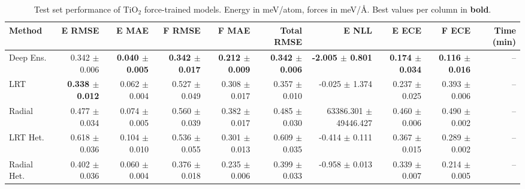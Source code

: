 \begin{table}
\centering
\caption{Test set performance of TiO$_2$ force-trained models. Energy in meV/atom, forces in meV/\AA{}. Best values per column in \textbf{bold}.}
\label{tab:tio2_results}
\begin{tabular}{lrrrrrrrrr}
\toprule
Method & E RMSE & E MAE & F RMSE & F MAE & Total RMSE & E NLL & E ECE & F ECE & Time (min) \\
\midrule
Deep Ens. & 0.342 $\pm$ 0.006 & \textbf{0.040 $\pm$ 0.005} & \textbf{0.342 $\pm$ 0.017} & \textbf{0.212 $\pm$ 0.009} & \textbf{0.342 $\pm$ 0.006} & \textbf{-2.005 $\pm$ 0.801} & \textbf{0.174 $\pm$ 0.034} & \textbf{0.116 $\pm$ 0.016} & -- \\
LRT & \textbf{0.338 $\pm$ 0.012} & 0.062 $\pm$ 0.004 & 0.527 $\pm$ 0.049 & 0.308 $\pm$ 0.017 & 0.357 $\pm$ 0.010 & -0.025 $\pm$ 1.374 & 0.237 $\pm$ 0.025 & 0.393 $\pm$ 0.006 & -- \\
Radial & 0.477 $\pm$ 0.034 & 0.074 $\pm$ 0.005 & 0.560 $\pm$ 0.039 & 0.382 $\pm$ 0.017 & 0.485 $\pm$ 0.030 & 63386.301 $\pm$ 49446.427 & 0.460 $\pm$ 0.006 & 0.490 $\pm$ 0.002 & -- \\
LRT Het. & 0.618 $\pm$ 0.036 & 0.104 $\pm$ 0.010 & 0.536 $\pm$ 0.055 & 0.301 $\pm$ 0.013 & 0.609 $\pm$ 0.035 & -0.414 $\pm$ 0.111 & 0.367 $\pm$ 0.015 & 0.289 $\pm$ 0.002 & -- \\
Radial Het. & 0.402 $\pm$ 0.036 & 0.060 $\pm$ 0.004 & 0.376 $\pm$ 0.018 & 0.235 $\pm$ 0.006 & 0.399 $\pm$ 0.033 & -0.958 $\pm$ 0.013 & 0.339 $\pm$ 0.007 & 0.214 $\pm$ 0.005 & -- \\
\bottomrule
\end{tabular}
\end{table}